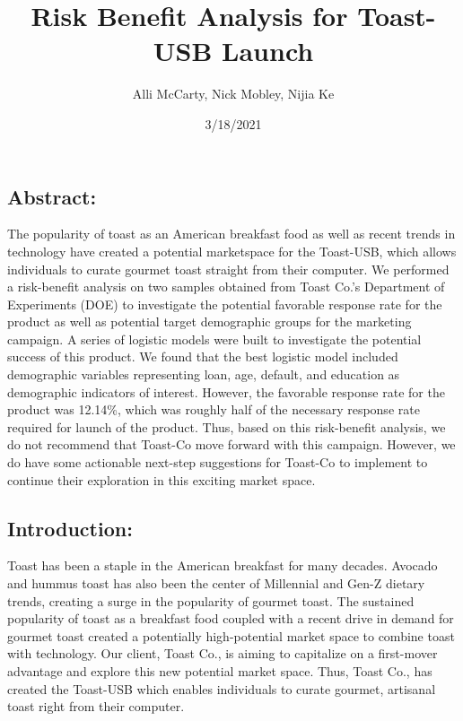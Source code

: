 \documentclass[]{article}
\title{Risk Benefit Analysis for Toast-USB Launch}
\author{Alli McCarty, Nick Mobley, Nijia Ke}
\date{3/18/2021}
\begin{document}
\maketitle

\hypertarget{abstract}{%
\subsection{Abstract:}\label{abstract}}

The popularity of toast as an American breakfast food as well as recent
trends in technology have created a potential marketspace for the
Toast-USB, which allows individuals to curate gourmet toast straight
from their computer. We performed a risk-benefit analysis on two samples
obtained from Toast Co.'s Department of Experiments (DOE) to investigate
the potential favorable response rate for the product as well as
potential target demographic groups for the marketing campaign. A series
of logistic models were built to investigate the potential success of
this product. We found that the best logistic model included demographic
variables representing loan, age, default, and education as demographic
indicators of interest. However, the favorable response rate for the
product was 12.14\%, which was roughly half of the necessary response
rate required for launch of the product. Thus, based on this
risk-benefit analysis, we do not recommend that Toast-Co move forward
with this campaign. However, we do have some actionable next-step
suggestions for Toast-Co to implement to continue their exploration in
this exciting market space.

\hypertarget{introduction}{%
\subsection{Introduction:}\label{introduction}}

Toast has been a staple in the American breakfast for many decades.
Avocado and hummus toast has also been the center of Millennial and
Gen-Z dietary trends, creating a surge in the popularity of gourmet
toast. The sustained popularity of toast as a breakfast food coupled
with a recent drive in demand for gourmet toast created a potentially
high-potential market space to combine toast with technology. Our
client, Toast Co., is aiming to capitalize on a first-mover advantage
and explore this new potential market space. Thus, Toast Co., has
created the Toast-USB which enables individuals to curate gourmet,
artisanal toast right from their computer.
\end{document}

